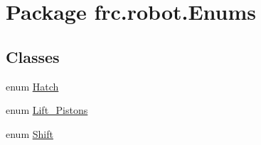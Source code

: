 \hypertarget{namespacefrc_1_1robot_1_1Enums}{}\section{Package frc.\+robot.\+Enums}
\label{namespacefrc_1_1robot_1_1Enums}
\subsection*{Classes}
\begin{DoxyCompactItemize}
\item 
enum \hyperlink{enumfrc_1_1robot_1_1Enums_1_1Hatch}{Hatch}
\item 
enum \hyperlink{enumfrc_1_1robot_1_1Enums_1_1Lift__Pistons}{Lift\+\_\+\+Pistons}
\item 
enum \hyperlink{enumfrc_1_1robot_1_1Enums_1_1Shift}{Shift}
\end{DoxyCompactItemize}
